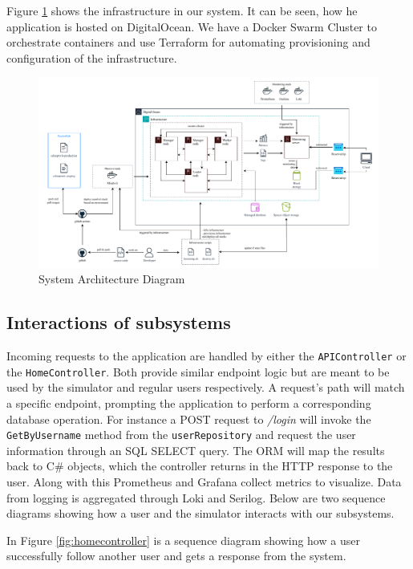 \noindent Figure \ref{fig:architecture} shows the infrastructure in our system.
It can be seen, how he application is hosted on DigitalOcean. We have a Docker Swarm Cluster to orchestrate containers and use Terraform for automating provisioning and configuration of the infrastructure.

\begin{figure}[H]
    \centering
    \includegraphics[width=1.0\textwidth]{figures/devops-architecture-architecture_v2.pdf}
    \caption{System Architecture Diagram}
    \label{fig:architecture}
\end{figure}


\subsection{Interactions of subsystems}
\label{systems:interactions}
Incoming requests to the application are handled by either the \texttt{APIController} or the \texttt{HomeController}. Both provide similar endpoint logic but are meant to be used by the simulator and regular users respectively. A request's path will match a specific endpoint, prompting the application to perform a corresponding database operation. For instance a POST request to \textit{/login} will invoke the \texttt{GetByUsername} method from the \texttt{userRepository} and request the user information through an SQL SELECT query. The ORM will map the results back to C\# objects, which the controller returns in the HTTP response to the user. 
Along with this Prometheus and Grafana collect metrics to visualize. Data from logging is aggregated through Loki and Serilog. Below are two sequence diagrams showing how a user and the simulator interacts with our subsystems.\newline

\noindent In Figure \ref{fig:homecontroller} is a sequence diagram showing how a user successfully follow another user and gets a response from the system.\newline

